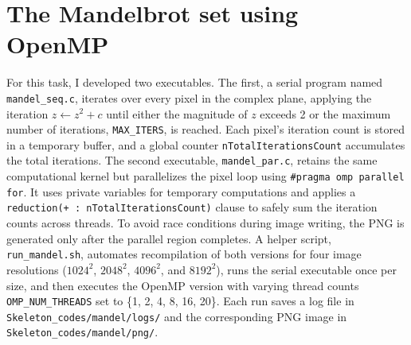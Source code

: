 \section{The Mandelbrot set using OpenMP }

For this task, I developed two executables. The first, a serial program named \texttt{mandel\_seq.c}, iterates over every pixel in the complex plane, applying the iteration $z \leftarrow z^2 + c$ until either the magnitude of $z$ exceeds 2 or the maximum number of iterations, \texttt{MAX\_ITERS}, is reached. Each pixel's iteration count is stored in a temporary buffer, and a global counter \texttt{nTotalIterationsCount} accumulates the total iterations. The second executable, \texttt{mandel\_par.c}, retains the same computational kernel but parallelizes the pixel loop using \verb|#pragma omp parallel for|. It uses private variables for temporary computations and applies a \verb|reduction(+ : nTotalIterationsCount)| clause to safely sum the iteration counts across threads. To avoid race conditions during image writing, the PNG is generated only after the parallel region completes. A helper script, \texttt{run\_mandel.sh}, automates recompilation of both versions for four image resolutions ($1024^2$, $2048^2$, $4096^2$, and $8192^2$), runs the serial executable once per size, and then executes the OpenMP version with varying thread counts \texttt{OMP\_NUM\_THREADS} set to \{1, 2, 4, 8, 16, 20\}. Each run saves a log file in \texttt{Skeleton\_codes/mandel/logs/} and the corresponding PNG image in \texttt{Skeleton\_codes/mandel/png/}. \\

